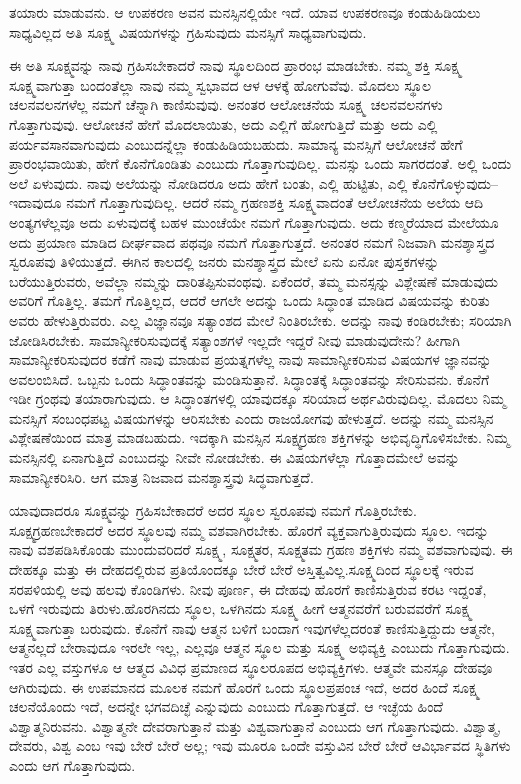 ತಯಾರು ಮಾಡುವನು. ಆ ಉಪಕರಣ ಅವನ ಮನಸ್ಸಿನಲ್ಲಿಯೇ ಇದೆ. ಯಾವ ಉಪಕರಣವೂ ಕಂಡುಹಿಡಿಯಲು ಸಾಧ್ಯವಿಲ್ಲದ ಅತಿ ಸೂಕ್ಷ್ಮ ವಿಷಯಗಳನ್ನು ಗ್ರಹಿಸುವುದು ಮನಸ್ಸಿಗೆ ಸಾಧ್ಯವಾಗುವುದು.

ಈ ಅತಿ ಸೂಕ್ಷ್ಮವನ್ನು ನಾವು ಗ್ರಹಿಸಬೇಕಾದರೆ ನಾವು ಸ್ಥೂಲದಿಂದ ಪ್ರಾರಂಭ ಮಾಡಬೇಕು. ನಮ್ಮ ಶಕ್ತಿ ಸೂಕ್ಷ್ಮ ಸೂಕ್ಷ್ಮವಾಗುತ್ತಾ ಬಂದಂತೆಲ್ಲಾ ನಾವು ನಮ್ಮ ಸ್ವಭಾವದ ಆಳ ಆಳಕ್ಕೆ ಹೋಗುವೆವು. ಮೊದಲು ಸ್ಥೂಲ ಚಲನವಲನಗಳೆಲ್ಲ ನಮಗೆ ಚೆನ್ನಾಗಿ ಕಾಣಿಸುವುವು. ಅನಂತರ ಆಲೋಚನೆಯ ಸೂಕ್ಷ್ಮ ಚಲನವಲನಗಳು ಗೊತ್ತಾಗುವುವು. ಆಲೋಚನೆ ಹೇಗೆ ಮೊದಲಾಯಿತು, ಅದು ಎಲ್ಲಿಗೆ ಹೋಗುತ್ತಿದೆ ಮತ್ತು ಅದು ಎಲ್ಲಿ ಪರ್ಯವಸಾನವಾಗುವುದು ಎಂಬುದನ್ನೆಲ್ಲಾ ಕಂಡುಹಿಡಿಯಬಹುದು. ಸಾಮಾನ್ಯ ಮನಸ್ಸಿಗೆ ಆಲೋಚನೆ ಹೇಗೆ ಪ್ರಾರಂಭವಾಯಿತು, ಹೇಗೆ ಕೊನೆಗೊಂಡಿತು ಎಂಬುದು ಗೊತ್ತಾಗುವುದಿಲ್ಲ. ಮನಸ್ಸು ಒಂದು ಸಾಗರದಂತೆ. ಅಲ್ಲಿ ಒಂದು ಅಲೆ ಏಳುವುದು. ನಾವು ಅಲೆಯನ್ನು ನೋಡಿದರೂ ಅದು ಹೇಗೆ ಬಂತು, ಎಲ್ಲಿ ಹುಟ್ಟಿತು, ಎಲ್ಲಿ ಕೊನೆಗೊಳ್ಳುವುದು–ಇದಾವುದೂ ನಮಗೆ ಗೊತ್ತಾಗುವುದಿಲ್ಲ. ಆದರೆ ನಮ್ಮ ಗ್ರಹಣಶಕ್ತಿ ಸೂಕ್ಷ್ಮವಾದಂತೆ ಆಲೋಚನೆಯ ಅಲೆಯ ಆದಿ ಅಂತ್ಯಗಳೆಲ್ಲವೂ ಅದು ಏಳುವುದಕ್ಕೆ ಬಹಳ ಮುಂಚೆಯೇ ನಮಗೆ ಗೊತ್ತಾಗುವುದು. ಅದು ಕಣ್ಮರೆಯಾದ ಮೇಲೆಯೂ ಅದು ಪ್ರಯಾಣ ಮಾಡಿದ ದೀರ್ಘವಾದ ಪಥವೂ ನಮಗೆ ಗೊತ್ತಾಗುತ್ತದೆ. ಅನಂತರ ನಮಗೆ ನಿಜವಾಗಿ ಮನಶ್ಶಾಸ್ತ್ರದ ಸ್ವರೂಪವು ತಿಳಿಯುತ್ತದೆ. ಈಗಿನ ಕಾಲದಲ್ಲಿ ಜನರು ಮನಶ್ಶಾಸ್ತ್ರದ ಮೇಲೆ ಏನು ಏನೋ ಪುಸ್ತಕಗಳನ್ನು ಬರೆಯುತ್ತಿರುವರು, ಅವೆಲ್ಲಾ ನಮ್ಮನ್ನು ದಾರಿತಪ್ಪಿಸುವಂಥವು. ಏಕೆಂದರೆ, ತಮ್ಮ ಮನಸ್ಸನ್ನು ವಿಶ್ಲೇಷಣೆ ಮಾಡುವುದು ಅವರಿಗೆ ಗೊತ್ತಿಲ್ಲ. ತಮಗೆ ಗೊತ್ತಿಲ್ಲದ, ಆದರೆ ಆಗಲೇ ಅದನ್ನು ಒಂದು ಸಿದ್ಧಾಂತ ಮಾಡಿದ ವಿಷಯವನ್ನು ಕುರಿತು ಅವರು ಹೇಳುತ್ತಿರುವರು. ಎಲ್ಲ ವಿಜ್ಞಾನವೂ ಸತ್ಯಾಂಶದ ಮೇಲೆ ನಿಂತಿರಬೇಕು. ಅದನ್ನು ನಾವು ಕಂಡಿರಬೇಕು; ಸರಿಯಾಗಿ ಜೋಡಿಸಿರಬೇಕು. ಸಾಮಾನ್ಯೀಕರಿಸುವುದಕ್ಕೆ ಸತ್ಯಾಂಶಗಳೆ ಇಲ್ಲದೇ ಇದ್ದರೆ ನೀವು ಮಾಡುವುದೇನು? ಹೀಗಾಗಿ ಸಾಮಾನ್ಯೀಕರಿಸುವುದರ ಕಡೆಗೆ ನಾವು ಮಾಡುವ ಪ್ರಯತ್ನಗಳೆಲ್ಲ ನಾವು ಸಾಮಾನ್ಯೀಕರಿಸುವ ವಿಷಯಗಳ ಜ್ಞಾನವನ್ನು ಅವಲಂಬಿಸಿದೆ. ಒಬ್ಬನು ಒಂದು ಸಿದ್ಧಾಂತವನ್ನು ಮಂಡಿಸುತ್ತಾನೆ. ಸಿದ್ಧಾಂತಕ್ಕೆ ಸಿದ್ಧಾಂತವನ್ನು ಸೇರಿಸುವನು. ಕೊನೆಗೆ ಇಡೀ ಗ್ರಂಥವು ತಯಾರಾಗುವುದು. ಆ ಸಿದ್ಧಾಂತಗಳಲ್ಲಿ ಯಾವುದಕ್ಕೂ ಸರಿಯಾದ ಅರ್ಥವಿರುವುದಿಲ್ಲ. ಮೊದಲು ನಿಮ್ಮ ಮನಸ್ಸಿಗೆ ಸಂಬಂಧಪಟ್ಟ ವಿಷಯಗಳನ್ನು ಆರಿಸಬೇಕು ಎಂದು ರಾಜಯೋಗವು ಹೇಳುತ್ತದೆ. ಅದನ್ನು ನಮ್ಮ ಮನಸ್ಸಿನ ವಿಶ್ಲೇಷಣೆಯಿಂದ ಮಾತ್ರ ಮಾಡಬಹುದು. ಇದಕ್ಕಾಗಿ ಮನಸ್ಸಿನ ಸೂಕ್ಷ್ಮಗ್ರಹಣ ಶಕ್ತಿಗಳನ್ನು ಅಭಿವೃದ್ಧಿಗೊಳಿಸಬೇಕು. ನಿಮ್ಮ ಮನಸ್ಸಿನಲ್ಲಿ ಏನಾಗುತ್ತಿದೆ ಎಂಬುದನ್ನು ನೀವೇ ನೋಡಬೇಕು. ಈ ವಿಷಯಗಳೆಲ್ಲಾ ಗೊತ್ತಾದಮೇಲೆ ಅವನ್ನು ಸಾಮಾನ್ಯೀಕರಿಸಿರಿ. ಆಗ ಮಾತ್ರ ನಿಜವಾದ ಮನಶ್ಶಾಸ್ತ್ರವು ಸಿದ್ಧವಾಗುತ್ತದೆ.

ಯಾವುದಾದರೂ ಸೂಕ್ಷ್ಮವನ್ನು ಗ್ರಹಿಸಬೇಕಾದರೆ ಅದರ ಸ್ಥೂಲ ಸ್ವರೂಪವು ನಮಗೆ ಗೊತ್ತಿರಬೇಕು. ಸೂಕ್ಷ್ಮಗ್ರಹಣಬೇಕಾದರೆ ಅದರ ಸ್ಥೂಲವು ನಮ್ಮ ವಶವಾಗಿರಬೇಕು. ಹೊರಗೆ ವ್ಯಕ್ತವಾಗುತ್ತಿರುವುದು ಸ್ಥೂಲ. ಇದನ್ನು ನಾವು ವಶಪಡಿಸಿಕೊಂಡು ಮುಂದುವರಿದರೆ ಸೂಕ್ಷ್ಮ, ಸೂಕ್ಷ್ಮತರ, ಸೂಕ್ಷ್ಮತಮ ಗ್ರಹಣ ಶಕ್ತಿಗಳು ನಮ್ಮ ವಶವಾಗುವುವು. ಈ ದೇಹಕ್ಕೂ ಮತ್ತು ಈ ದೇಹದಲ್ಲಿರುವ ಪ್ರತಿಯೊಂದಕ್ಕೂ ಬೇರೆ ಬೇರೆ ಅಸ್ತಿತ್ವವಿಲ್ಲ.\break ಸೂಕ್ಷ್ಮದಿಂದ ಸ್ಥೂಲಕ್ಕೆ ಇರುವ ಸರಪಳಿಯಲ್ಲಿ ಅವು ಹಲವು ಕೊಂಡಿಗಳು. ನೀವು ಪೂರ್ಣ, ಈ ದೇಹವು ಹೊರಗೆ ಕಾಣಿಸುತ್ತಿರುವ ಕರಟ ಇದ್ದಂತೆ, ಒಳಗೆ ಇರುವುದು ತಿರುಳು.\break ಹೊರಗಿನದು ಸ್ಥೂಲ, ಒಳಗಿನದು ಸೂಕ್ಷ್ಮ ಹೀಗೆ ಆತ್ಮನವರೆಗೆ ಬರುವವರೆಗೆ ಸೂಕ್ಷ್ಮ ಸೂಕ್ಷ್ಮವಾಗುತ್ತಾ ಬರುವುದು. ಕೊನೆಗೆ ನಾವು ಆತ್ಮನ ಬಳಿಗೆ ಬಂದಾಗ ಇವುಗಳೆಲ್ಲದರಂತೆ ಕಾಣಿಸುತ್ತಿದ್ದುದು ಆತ್ಮನೇ, ಆತ್ಮನಲ್ಲದೆ ಬೇರಾವುದೂ ಇರಲೇ ಇಲ್ಲ, ಎಲ್ಲವೂ ಆತ್ಮನ ಸ್ಥೂಲ ಮತ್ತು ಸೂಕ್ಷ್ಮ ಅಭಿವ್ಯಕ್ತಿ ಎಂಬುದು ಗೊತ್ತಾಗುವುದು. ಇತರ ಎಲ್ಲ ವಸ್ತುಗಳೂ ಆ ಆತ್ಮದ ವಿವಿಧ ಪ್ರಮಾಣದ ಸ್ಥೂಲರೂಪದ ಅಭಿವ್ಯಕ್ತಿಗಳು. ಆತ್ಮವೇ ಮನಸ್ಸೂ ದೇಹವೂ ಆಗಿರುವುದು. ಈ ಉಪಮಾನದ ಮೂಲಕ ನಮಗೆ ಹೊರಗೆ ಒಂದು ಸ್ಥೂಲಪ್ರಪಂಚ ಇದೆ, ಅದರ ಹಿಂದೆ ಸೂಕ್ಷ್ಮ ಚಲನೆಯೊಂದು ಇದೆ, ಅದನ್ನೇ ಭಗವದಿಚ್ಛೆ ಎನ್ನುವುದು ಎಂಬುದು ಗೊತ್ತಾಗುತ್ತದೆ. ಆ ಇಚ್ಛೆಯ ಹಿಂದೆ ವಿಶ್ವಾತ್ಮನಿರುವನು. ವಿಶ್ವಾತ್ಮನೇ ದೇವರಾಗುತ್ತಾನೆ ಮತ್ತು ವಿಶ್ವವಾಗುತ್ತಾನೆ ಎಂಬುದು ಆಗ ಗೊತ್ತಾಗುವುದು. ವಿಶ್ವಾತ್ಮ, ದೇವರು, ವಿಶ್ವ ಎಂಬ ಇವು ಬೇರೆ ಬೇರೆ ಅಲ್ಲ; ಇವು ಮೂರೂ ಒಂದೇ ವಸ್ತುವಿನ ಬೇರೆ ಬೇರೆ ಆವಿರ್ಭಾವದ ಸ್ಥಿತಿಗಳು ಎಂದು ಆಗ ಗೊತ್ತಾಗುವುದು.

